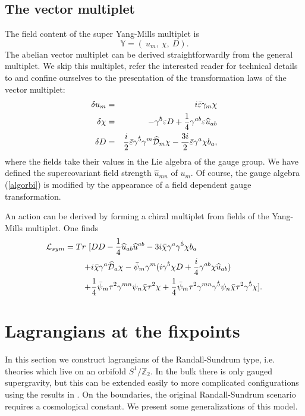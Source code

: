 \documentclass[a4paper,12pt, twoside]{article}
\numberwithin{equation}{section}
\begin{document}
\subsection{The vector multiplet}\label{vec}
The field content of the super Yang-Mills multiplet is
\[
\mathbb{Y}=(~u_m,~\chi,~ D).
\]
The abelian vector multiplet can be derived straightforwardly from the 
general multiplet. We skip this multiplet, refer the interested reader 
for technical details to \cite{diss} and confine ourselves to the 
presentation of the transformation laws of the vector multiplet:
  \begin{eqnarray*}
\delta u_m & = & i\bar{\varepsilon}\gamma_m\chi\\
\delta \chi & = & -\gamma^{\dot{5}}\varepsilon D + 
\frac{1}{4}\gamma^{ab}\varepsilon \widehat{u}_{ab}\\
\delta D & = 
&\frac{i}{2}\bar{\varepsilon}\gamma^{\dot{5}}\gamma^m\widehat{\cal D}_m\chi-\frac{3i}{2}\bar{\varepsilon}\gamma^a\chi b_a,
\end{eqnarray*}
where the fields take their values in the Lie algebra of the gauge 
group. We have defined the supercovariant field strength $\widehat{u}_{mn}$ 
of $u_m$. Of course, the gauge algebra (\ref{algorbi}) is modified by 
the appearance of a field dependent gauge transformation.

An action can be derived by forming a chiral multiplet from fields of 
the Yang-Mills multiplet. One finds \cite{Sohnius:1983xs, diss}
\begin{equation}
\begin{split}
{\cal L}_{sym} = Tr~ [ & D D 
-\frac{1}{4}\widehat{u}_{ab}\widehat{u}^{ab}-3i\bar{\chi}\gamma^a\gamma^{\dot{5}}\chi b_a\\
+ & i\bar{\chi}\gamma^a\widehat{\cal D}_a\chi
- \bar{\psi}_m\gamma^m(i\gamma^{\dot{5}}\chi 
D+\frac{i}{4}\gamma^{ab}\chi\widehat{u}_{ab})\\
 + & 
\frac{1}{4}\bar{\psi}_m\tau^2\gamma^{mn}\psi_n\bar{\chi}\tau^2\chi+\frac{1}{4}\bar{\psi}_m\tau^2\gamma^{mn}\gamma^{\dot{5}}\psi_n\bar{\chi}\tau^2\gamma^{\dot{5}}\chi].\label{lqed}
\end{split}
\end{equation}
\section{Lagrangians at the fixpoints}\label{chap4}
In this section we construct lagrangians of the Randall-Sundrum type, 
i.e. theories which live on an orbifold $S^1/\mathbb{Z}_2$. In the bulk 
there is only gauged supergravity, but this can be extended easily to 
more complicated configurations using the results in 
\cite{Zucker:1999fn, diss}. On the boundaries, the original Randall-Sundrum scenario 
\cite{Randall:1999ee} requires a cosmological constant. We present some 
generalizations of this model. 
\end{document}
